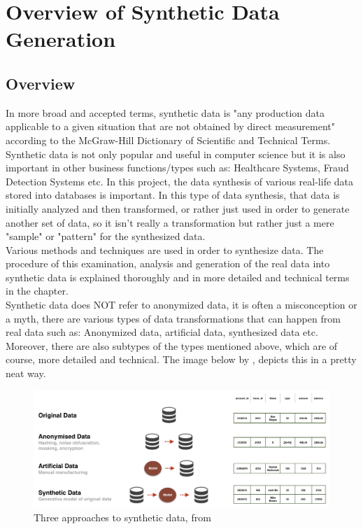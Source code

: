 \chapter{Overview of Synthetic Data Generation}
\section{Overview}
In more broad and accepted terms, synthetic data is "any production data applicable to a given situation that are not obtained by direct measurement" according to the McGraw-Hill Dictionary of Scientific and Technical Terms.\\ Synthetic data is not only popular and useful in computer science but it is also important in other business functions/types such as: Healthcare Systems, Fraud Detection Systems etc. In this project, the data synthesis of various real-life data stored into databases is important. In this type of data synthesis, that data is initially analyzed and then transformed, or rather just used in order to generate another set of data, so it isn't really a transformation but rather just a mere "sample" or "pattern" for the synthesized data. \\
Various methods and techniques are used in order to synthesize data. The procedure of this examination, analysis and generation of the real data into synthetic data is explained thoroughly and in more detailed and technical terms in the  chapter.\\
Synthetic data does NOT refer to anonymized data, it is often a misconception or a myth, there are various types of data transformations that can happen from real data such as: Anonymized data, artificial data, synthesized data etc. Moreover, there are also subtypes of the types mentioned above, which are of course, more detailed and technical. The image below by \citeauthor{Synthesized_2018}, depicts this in a pretty neat way.
\begin{figure}[H]
	\includegraphics[width=\linewidth]{./Figures/Synthetic_Data/types_of_data_comparison.png}
	\caption{Three approaches to synthetic data, from \citeauthor{Synthesized_2018}}
\end{figure}
